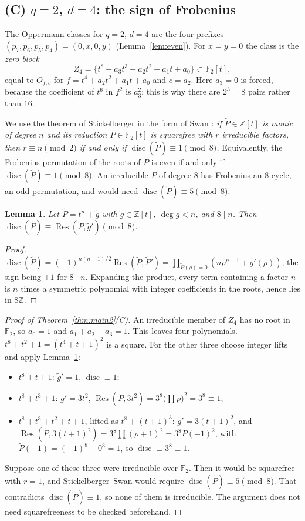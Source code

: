 \documentclass[11pt,a4paper]{amsart}
\newtheorem{lemma}[theorem]{Lemma}
\theoremstyle{definition}
\theoremstyle{remark}
\newcommand{\F}{\mathbb{F}}
\newcommand{\Z}{\mathbb{Z}}
\newcommand{\disc}{\operatorname{disc}}
\newcommand{\Res}{\operatorname{Res}}
\begin{document}
\subsection{\texorpdfstring{(C) $q=2$, $d=4$: the sign of Frobenius}{(C) q=2, d=4: the sign of Frobenius}}

The Oppermann classes for $q=2$, $d=4$ are the four prefixes $(p_7,p_6,p_5,p_4)=(0,x,0,y)$ (Lemma~\ref{lem:even}).
For $x=y=0$ the class is the \emph{zero block}
\[
Z_4=\{t^8+a_3t^3+a_2t^2+a_1t+a_0\}\subset\F_2[t],
\]
equal to $O_{f,c}$ for $f=t^4+a_2t^2+a_1t+a_0$ and $c=a_2$. Here $a_3=0$ is forced, because the coefficient of
$t^6$ in $f^2$ is $a_3^2$; this is why there are $2^3=8$ pairs rather than $16$.

We use the theorem of Stickelberger \cite{Stickelberger} in the form of Swan \cite[Cor.~1]{Swan}: \emph{if
$\tilde P\in\Z[t]$ is monic of degree $n$ and its reduction $P\in\F_2[t]$ is squarefree with $r$ irreducible
factors, then $r\equiv n\pmod2$ if and only if $\disc(\tilde P)\equiv1\pmod8$.} Equivalently, the Frobenius
permutation of the roots of $P$ is even if and only if $\disc(\tilde P)\equiv1\pmod 8$. An irreducible $P$ of degree $8$
has Frobenius an $8$-cycle, an odd permutation, and would need $\disc(\tilde P)\equiv5\pmod8$.

\begin{lemma}\label{lem:tail}
Let $\tilde P=t^n+\tilde g$ with $\tilde g\in\Z[t]$, $\deg\tilde g<n$, and $8\mid n$. Then
$\disc(\tilde P)\equiv\Res(\tilde P,\tilde g')\pmod8$.
\end{lemma}

\begin{proof}
$\disc(\tilde P)=(-1)^{n(n-1)/2}\Res(\tilde P,\tilde P')=\prod_{\tilde P(\rho)=0}(n\rho^{n-1}+\tilde g'(\rho))$, the
sign being $+1$ for $8\mid n$. Expanding the product, every term containing a factor $n$ is $n$ times a symmetric
polynomial with integer coefficients in the roots, hence lies in $8\Z$.
\end{proof}

\begin{proof}[Proof of Theorem~\ref{thm:main2}(C)]
An irreducible member of $Z_4$ has no root in $\F_2$, so $a_0=1$ and $a_1+a_2+a_3=1$. This leaves four polynomials.
$t^8+t^2+1=(t^4+t+1)^2$ is a square. For the other three choose integer lifts and apply Lemma~\ref{lem:tail}:
\begin{itemize}
\item $t^8+t+1$: $\tilde g'=1$, $\disc\equiv1$;
\item $t^8+t^3+1$: $\tilde g'=3t^2$, $\Res(\tilde P,3t^2)=3^8\big(\prod\rho\big)^2=3^8\equiv1$;
\item $t^8+t^3+t^2+t+1$, lifted as $t^8+(t+1)^3$: $\tilde g'=3(t+1)^2$, and
$\Res(\tilde P,3(t+1)^2)=3^8\prod(\rho+1)^2=3^8\tilde P(-1)^2$, with $\tilde P(-1)=(-1)^8+0^3=1$, so
$\disc\equiv3^8\equiv1$.
\end{itemize}
Suppose one of these three were irreducible over $\F_2$. Then it would be squarefree with $r=1$, and
Stickelberger--Swan would require $\disc(\tilde P)\equiv5\pmod8$. That contradicts $\disc(\tilde P)\equiv1$, so none of
them is irreducible. The argument does not need squarefreeness to be checked beforehand.
\end{proof}
\end{document}

